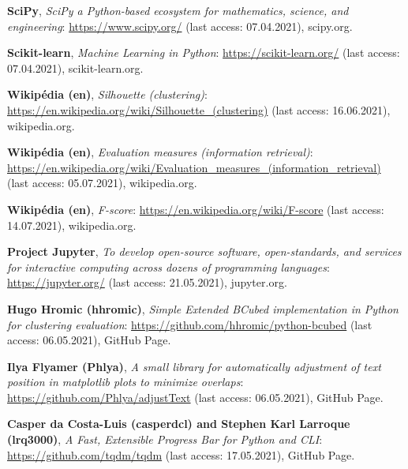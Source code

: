 \begin{thebibliography}{9}
\textbf{SciPy},
\textit{SciPy a Python-based ecosystem for mathematics, science, and engineering}: \url{https://www.scipy.org/} (last access: 07.04.2021),
scipy.org.

\textbf{Scikit-learn},
\textit{Machine Learning in Python}: \url{https://scikit-learn.org/} (last access: 07.04.2021),
scikit-learn.org.

\textbf{Wikipédia (en)},
\textit{Silhouette (clustering)}: \url{https://en.wikipedia.org/wiki/Silhouette_(clustering)} (last access: 16.06.2021),
wikipedia.org.

\textbf{Wikipédia (en)},
\textit{Evaluation measures (information retrieval)}: \url{https://en.wikipedia.org/wiki/Evaluation_measures_(information_retrieval)} (last access: 05.07.2021),
wikipedia.org.

\textbf{Wikipédia (en)},
\textit{F-score}: \url{https://en.wikipedia.org/wiki/F-score} (last access: 14.07.2021),
wikipedia.org.

\textbf{Project Jupyter},
\textit{To develop open-source software, open-standards, and services for interactive computing across dozens of programming languages}: \url{https://jupyter.org/} (last access: 21.05.2021),
jupyter.org.

\textbf{Hugo Hromic (hhromic)},
\textit{Simple Extended BCubed implementation in Python for clustering evaluation}: \url{https://github.com/hhromic/python-bcubed} (last access: 06.05.2021),
GitHub Page.

\textbf{Ilya Flyamer (Phlya)},
\textit{A small library for automatically adjustment of text position in matplotlib plots to minimize overlaps}: \url{https://github.com/Phlya/adjustText} (last access: 06.05.2021),
GitHub Page.

\textbf{Casper da Costa-Luis (casperdcl) and Stephen Karl Larroque (lrq3000)},
\textit{A Fast, Extensible Progress Bar for Python and CLI}: \url{https://github.com/tqdm/tqdm} (last access: 17.05.2021),
GitHub Page.

\end{thebibliography}
